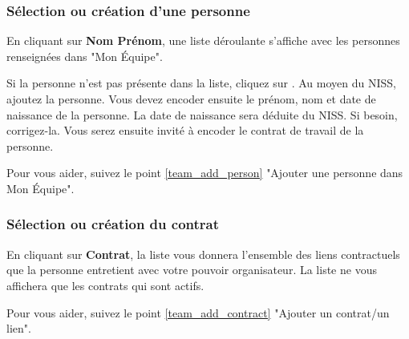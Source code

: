 \subsubsection{Sélection ou création d'une personne}
En cliquant sur \textbf{Nom Prénom}, une liste déroulante s'affiche avec les personnes renseignées dans "Mon Équipe". 

Si la personne n'est pas présente dans la liste, cliquez sur . Au moyen du NISS, ajoutez la personne. Vous devez encoder ensuite le prénom, nom et date de naissance de la personne. La date de naissance sera déduite du NISS. Si besoin, corrigez-la. Vous serez ensuite invité à encoder le contrat de travail de la personne. 

\begin{conseil}
Pour vous aider, suivez le point \ref{team_add_person} "Ajouter une personne dans Mon Équipe".
\end{conseil}

\subsubsection{Sélection ou création du contrat}
    En cliquant sur \textbf{Contrat}, la liste vous donnera l'ensemble des liens contractuels que la personne entretient avec votre pouvoir organisateur. La liste ne vous affichera que les contrats qui sont actifs. 
    \begin{conseil}
     Pour vous aider, suivez le point \ref{team_add_contract} "Ajouter un contrat/un lien".
    \end{conseil}   
    
\vspace{0.5cm}

